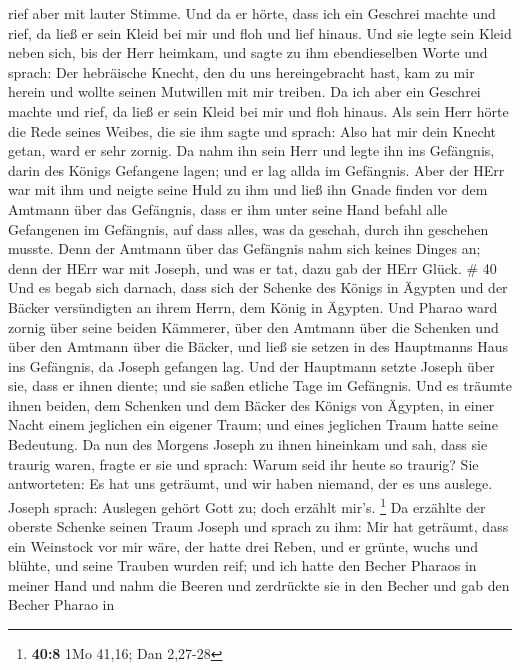 rief aber mit lauter Stimme.  Und da er hörte, dass ich ein
Geschrei machte und rief, da ließ er sein Kleid bei mir und floh und
lief hinaus.  Und sie legte sein Kleid neben sich, bis der
Herr heimkam,  und sagte zu ihm ebendieselben Worte und
sprach: Der hebräische Knecht, den du uns hereingebracht hast, kam zu
mir herein und wollte seinen Mutwillen mit mir treiben.  Da
ich aber ein Geschrei machte und rief, da ließ er sein Kleid bei mir und
floh hinaus.  Als sein Herr hörte die Rede seines Weibes,
die sie ihm sagte und sprach: Also hat mir dein Knecht getan, ward er
sehr zornig.  Da nahm ihn sein Herr und legte ihn ins
Gefängnis, darin des Königs Gefangene lagen; und er lag allda im
Gefängnis.  Aber der HErr war mit ihm und neigte seine Huld
zu ihm und ließ ihn Gnade finden vor dem Amtmann über das Gefängnis,
 dass er ihm unter seine Hand befahl alle Gefangenen im
Gefängnis, auf dass alles, was da geschah, durch ihn geschehen musste.
 Denn der Amtmann über das Gefängnis nahm sich keines
Dinges an; denn der HErr war mit Joseph, und was er tat, dazu gab der
HErr Glück. \# 40  Und es begab sich darnach, dass sich der
Schenke des Königs in Ägypten und der Bäcker versündigten an ihrem
Herrn, dem König in Ägypten.  Und Pharao ward zornig über
seine beiden Kämmerer, über den Amtmann über die Schenken und über den
Amtmann über die Bäcker,  und ließ sie setzen in des
Hauptmanns Haus ins Gefängnis, da Joseph gefangen lag.  Und
der Hauptmann setzte Joseph über sie, dass er ihnen diente; und sie
saßen etliche Tage im Gefängnis.  Und es träumte ihnen
beiden, dem Schenken und dem Bäcker des Königs von Ägypten, in einer
Nacht einem jeglichen ein eigener Traum; und eines jeglichen Traum hatte
seine Bedeutung.  Da nun des Morgens Joseph zu ihnen
hineinkam und sah, dass sie traurig waren,  fragte er sie
und sprach: Warum seid ihr heute so traurig?  Sie
antworteten: Es hat uns geträumt, und wir haben niemand, der es uns
auslege. Joseph sprach: Auslegen gehört Gott zu; doch erzählt mir's.
\footnote{\textbf{40:8} 1Mo 41,16; Dan 2,27-28}  Da erzählte
der oberste Schenke seinen Traum Joseph und sprach zu ihm: Mir hat
geträumt, dass ein Weinstock vor mir wäre,  der hatte drei
Reben, und er grünte, wuchs und blühte, und seine Trauben wurden reif;
 und ich hatte den Becher Pharaos in meiner Hand und nahm
die Beeren und zerdrückte sie in den Becher und gab den Becher Pharao in
